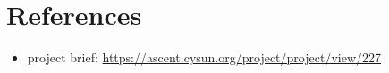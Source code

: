 \documentclass{article}
\begin{document}
\section{References}
\begin{itemize}
  \item project brief: \url{https://ascent.cysun.org/project/project/view/227}
\end{itemize}
\end{document}
